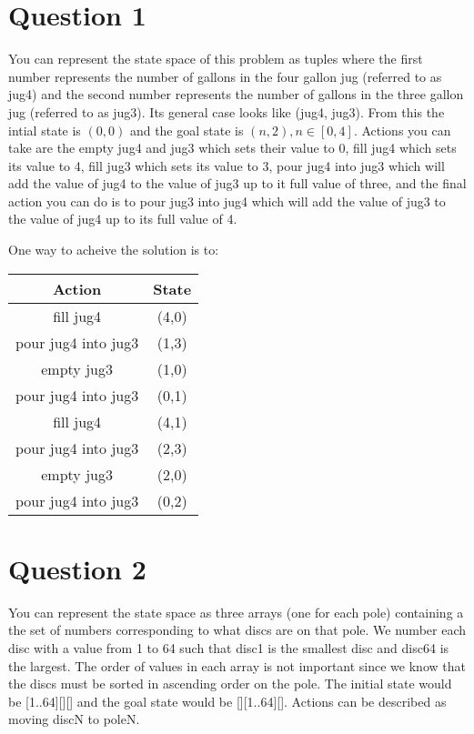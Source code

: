 \documentclass[12pt]{article}
\begin{document}
\section*{Question 1} %
\label{sec:question_1}
You can represent the state space of this problem as tuples where the first number represents the number of gallons in the four gallon jug (referred to as jug4) and the second number represents the number of gallons in the three gallon jug (referred to as jug3). Its general case looks like (jug4, jug3). From this the intial state is $(0,0)$ and the goal state is $(n, 2), n\in [0,4]$. Actions you can take are the empty jug4 and jug3 which sets their value to 0, fill jug4 which sets its value to 4, fill jug3 which sets its value to 3, pour jug4 into jug3 which will add the value of jug4 to the value of jug3 up to it full value of three, and the final action you can do is to pour jug3 into jug4 which will add the value of jug3 to the value of jug4 up to its full value of 4.

One way to acheive the solution is to:

\begin{center}
\begin{tabular}{c|c}
  \textbf{Action} & \textbf{State}\\
  \hline
  fill jug4 & (4,0)\\
  \hline
  pour jug4 into jug3 & (1,3)\\
  \hline
  empty jug3 & (1,0)\\
  \hline
  pour jug4 into jug3 & (0,1)\\
  \hline
  fill jug4 & (4,1)\\
  \hline
  pour jug4 into jug3 & (2,3)\\
  \hline
  empty jug3 & (2,0)\\
  \hline 
  pour jug4 into jug3 & (0,2)\\
\end{tabular}
\end{center}


\section*{Question 2} %
\label{sec:question_2}
You can represent the state space as three arrays (one for each pole) containing a the set of numbers corresponding to what discs are on that pole. We number each disc with a value from 1 to 64 such that disc1 is the smallest disc and disc64 is the largest. The order of values in each array is not important since we know that the discs must be sorted in ascending order on the pole. The initial state would be [1..64][][] and the goal state would be [][1..64][]. Actions can be described as moving discN to poleN.
\end{document}
